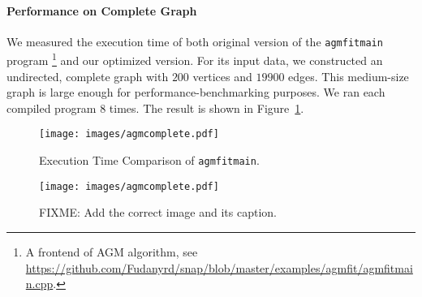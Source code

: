 \paragraph{Performance on Complete Graph} We measured the execution time of 
both original version of the \texttt{agmfitmain} program
\footnote{A frontend of AGM algorithm, see \url{https://github.com/Fudanyrd/snap/blob/master/examples/agmfit/agmfitmain.cpp}.}
 and our optimized version. For its input data, we constructed an undirected,
complete graph with $200$ vertices and $19900$ edges. This medium-size graph 
is large enough  for performance-benchmarking purposes.
We ran each compiled program $8$ times.
The result is shown in Figure~\ref{fig:agmcomplete}.

\begin{figure*}[ht]
    \centering
    \begin{subfigure}[b]{0.45\textwidth}
        \texttt{[image: images/agmcomplete.pdf]}
        \caption{Execution Time Comparison of \texttt{agmfitmain}. }
        \label{fig:agmcomplete}
    \end{subfigure}
    \begin{subfigure}[b]{0.45\textwidth}
        \texttt{[image: images/agmcomplete.pdf]}
        \caption{FIXME:  Add the correct image and its caption.}
    \end{subfigure}
\end{figure*}


